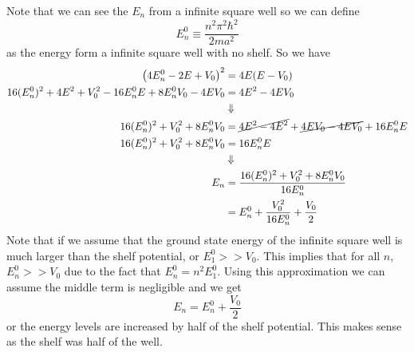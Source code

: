 \documentclass[11pt]{article}
\numberwithin{equation}{section}
\begin{document}
Note that we can see the $E_n$ from a infinite square well so we can define
$$E_n^0 \equiv \frac{n^2\pi^2\hbar^2}{2ma^2}$$
as the energy form a infinite square well with no shelf. So we have
\begin{align*}
\left(4E_n^0 - 2E + V_0\right)^2 &= 4E(E-V_0)\\
16(E_n^0)^2 + 4E^2 + V_0^2 -16E_n^0E + 8E_n^0V_0 - 4EV_0 &= 4E^2-4EV_0\\
&\Downarrow\\
16(E_n^0)^2 + V_0^2 + 8E_n^0V_0 &=  \cancel{4E^2-4E^2} + \cancel{4EV_0  - 4EV_0} + 16E_n^0E\\
16(E_n^0)^2 + V_0^2 + 8E_n^0V_0 &= 16E_n^0E\\
&\Downarrow\\
E_n &= \frac{16(E_n^0)^2 + V_0^2 + 8E_n^0V_0}{16E_n^0}\\
&= E_n^0 + \frac{V_0^2}{16E_n^0} + \frac{V_0}{2}
\end{align*}
Note that if we assume that the ground state energy of the infinite square well is much larger than the shelf potential, or $E_1^0 >> V_0$. This implies that for all $n$, $E_n^0>>V_0$ due to the fact that $E_n^0 = n^2E_1^0$. Using this approximation we can assume the middle term is negligible and we get
$$E_n = E_n^0 + \frac{V_0}{2}$$
or the energy levels are increased by half of the shelf potential. This makes sense as the shelf was half of the well.
\end{document}
